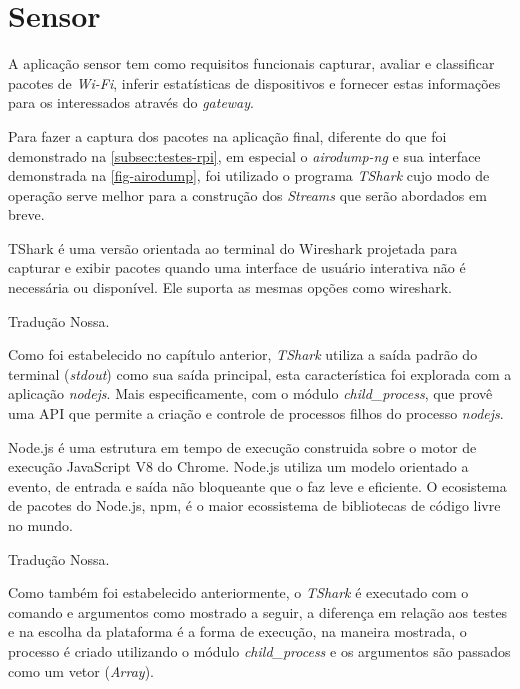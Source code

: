 \section{Sensor}
\label{sec:app-sensor}


A aplicação sensor tem como requisitos funcionais capturar, avaliar e classificar pacotes de
\emph{Wi-Fi}, inferir estatísticas de dispositivos e fornecer estas informações para
os interessados através do \emph{gateway}.

Para fazer a captura dos pacotes na aplicação final, diferente do que foi
demonstrado na \autoref{subsec:testes-rpi}, em especial o \emph{airodump-ng} e
sua interface demonstrada na \autoref{fig-airodump}, foi utilizado o programa
\emph{TShark} cujo modo de operação serve melhor para a construção dos
\emph{Streams} que serão abordados em breve.

\begin{citacao}

	TShark é uma versão orientada ao terminal do Wireshark projetada para capturar
	e exibir pacotes quando uma interface de usuário interativa não é necessária ou
	disponível. Ele suporta as mesmas opções como wireshark. \

	 Tradução Nossa.
\end{citacao}

Como foi estabelecido no capítulo anterior, \emph{TShark}	utiliza a saída
padrão	do terminal (\emph{stdout}) como sua saída principal, esta
característica foi explorada com a aplicação \emph{nodejs}. Mais especificamente,
com o módulo \emph{child\_process},	que provê uma API que permite a criação e
controle de processos filhos do processo \emph{nodejs}.

\begin{citacao}

	Node.js é uma estrutura em tempo de execução construida sobre o motor de
	execução JavaScript V8 do Chrome. Node.js utiliza um modelo orientado a
	evento, de entrada e saída não bloqueante que o faz leve e eficiente.
	O ecosistema de pacotes do Node.js, npm, é o maior ecossistema de bibliotecas
	de código livre no mundo. \

	 Tradução Nossa.
\end{citacao}

Como também foi estabelecido anteriormente, o \emph{TShark} é executado com o
comando e argumentos como mostrado a seguir, a diferença em relação aos testes e
na escolha da plataforma é a forma de execução, na maneira mostrada, o processo é
criado utilizando o módulo \emph{child\_process} \cite{child_process} e os
argumentos são passados como um vetor (\emph{Array}).

